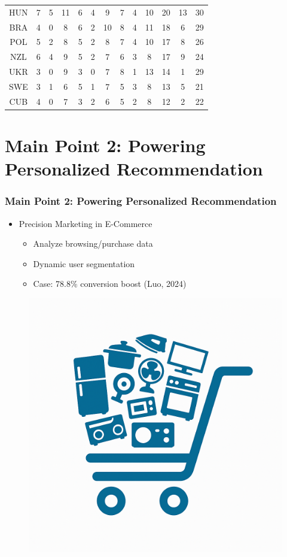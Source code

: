 \documentclass{beamer}
\begin{document}
\begin{frame}[t]
\begin{minipage}{\textwidth}
\begin{tabular}{|c|c|c|c|c|c|c|c|c|c|c|c|c|}
        HUN & 7 & 5 & 11 & 6 & 4 & 9 & 7 & 4 & 10 & 20 & 13 & 30 \\
        BRA & 4 & 0 & 8 & 6 & 2 & 10 & 8 & 4 & 11 & 18 & 6 & 29 \\
        POL & 5 & 2 & 8 & 5 & 2 & 8 & 7 & 4 & 10 & 17 & 8 & 26 \\
        NZL & 6 & 4 & 9 & 5 & 2 & 7 & 6 & 3 & 8 & 17 & 9 & 24 \\
        UKR & 3 & 0 & 9 & 3 & 0 & 7 & 8 & 1 & 13 & 14 & 1 & 29 \\
        SWE & 3 & 1 & 6 & 5 & 1 & 7 & 5 & 3 & 8 & 13 & 5 & 21 \\
        CUB & 4 & 0 & 7 & 3 & 2 & 6 & 5 & 2 & 8 & 12 & 2 & 22 \\
\hline
\end{tabular}
\label{tab:medal_anticipation}
\end{minipage}
\end{frame}


\section{Main Point 2: Powering Personalized Recommendation}
\begin{frame}
 \frametitle{Main Point 2: Powering Personalized Recommendation}
\begin{minipage}{\textwidth}
{\linespread{1.3}
\begin{itemize}
    \item {\Large Precision Marketing in E-Commerce}
    \begin{itemize}
        \item <1-> {\large Analyze browsing/purchase data}
        \item <2-> {\large Dynamic user segmentation}
        \item <3-> {\large Case: 78.8\% conversion boost} (Luo, 2024)
    \end{itemize}
\end{itemize}
}
\begin{figure}
    \centering
    \includegraphics[width=0.35\linewidth]{figure 9.png}
    \label{fig:enter-label}
\end{figure}
\end{minipage}
\end{frame}
\end{document}

